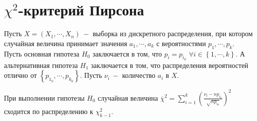 \clearpage

\section{$\chi ^ 2$-критерий Пирсона}
Пусть $X = \left(X_1, \cdots, X_n\right) \ - $ выборка из дискретного распределения, при котором случайная величина принимает значения $a_1, \cdots, a_k$ с вероятностями $p_1, \cdots, p_k$. Пусть основная гипотеза $H_0$ заключается в том, что $p_i = p_{i_0}$ $\forall i \in \left\{1, \cdots, k\right\}$. А альтернативная гипотеза $H_1$ заключается в том, что распределения вероятностей отлично от $\left\{p_{1_0}, \cdots, p_{k_0}\right\}$. Пусть $\nu_i \ - $ количество $a_i$ в $X$.


\begin{theorem}
При выполнении гипотезы $H_0$ случайная величина $\overline{\chi} ^ 2 = \sum_{i= 1}^{k}\left(\frac{\nu_i - np_{i_0}}{\sqrt{n p_{i_0}}}\right) ^ 2$ сходится по распределению к $\chi ^ 2_{k - 1}$.
\end{theorem}
